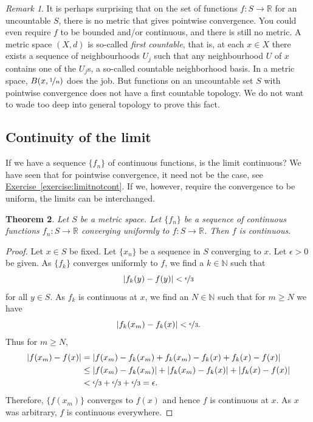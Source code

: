 \documentclass[12pt,openany]{book}
\newcommand{\abs}[1]{\left\lvert {#1} \right\rvert}
\newcommand{\R}{{\mathbb{R}}}
\newcommand{\N}{{\mathbb{N}}}
\newcommand{\myindex}[1]{#1\index{#1}}
\theoremstyle{plain}
\newtheorem{thm}{Theorem}[section]
\theoremstyle{remark}
\newtheorem{remark}[thm]{Remark}
\theoremstyle{definition}
\theoremstyle{exercise}
\theoremstyle{example}
\newcommand{\exerciseref}[1]{\hyperref[#1]{Exercise~\ref*{#1}}}
\begin{document}
\begin{remark}
It is perhaps surprising that on the set of functions $f \colon S \to
\R$ for an uncountable $S$, there is no metric that gives pointwise convergence.
You could even require $f$ to be bounded and/or continuous, and there is
still no metric.
A metric space $(X,d)$ is so-called \emph{\myindex{first countable}}, that
is, at each $x \in X$ there exists a sequence of neighbourhoods $U_j$ such
that any neighbourhood $U$ of $x$ contains one of the $U_j$s, a so-called
countable neighborhood basis.  In a metric space, $B(x,\nicefrac{1}{n})$
does the job.  But functions on an uncountable set $S$ with pointwise
convergence does not have a first countable topology.  We do not want to
wade too deep into general topology to prove this fact.
\end{remark}

\subsection{Continuity of the limit}

If we have a sequence $\{ f_n \}$ of continuous functions,
is the limit continuous?  We have seen that for pointwise
convergence, it need not be the case, see \exerciseref{exercise:limitnotcont}.
If we, however, require the convergence to be uniform, the limits can
be interchanged.

\begin{thm} \label{thm:uniformlimitcont}
Let $S$ be a metric space.
Let $\{ f_n \}$ be 
a sequence of continuous functions $f_n \colon S \to \R$ converging
uniformly to  $f \colon S \to \R$.  Then $f$ is continuous.
\end{thm}

\begin{proof}
Let $x \in S$ be fixed.  Let $\{ x_n \}$ be a sequence in $S$
converging to $x$.
Let $\epsilon > 0$ be given.
As $\{ f_k \}$ converges uniformly to $f$, we find a $k \in \N$ such that
\begin{equation*}
\abs{f_k(y)-f(y)} < \nicefrac{\epsilon}{3}
\end{equation*}
for all $y \in S$.  As $f_k$ is continuous at $x$,
we find an $N \in \N$ such that for $m \geq N$
we have 
\begin{equation*}
\abs{f_k(x_m)-f_k(x)} < \nicefrac{\epsilon}{3} .
\end{equation*}
Thus for
$m \geq N$,
\begin{equation*}
\begin{split}
\abs{f(x_m)-f(x)}
& =
\abs{f(x_m)-f_k(x_m)+f_k(x_m)-f_k(x)+f_k(x)-f(x)}
\\
& \leq
\abs{f(x_m)-f_k(x_m)}+
\abs{f_k(x_m)-f_k(x)}+
\abs{f_k(x)-f(x)}
\\
& <
\nicefrac{\epsilon}{3} +
\nicefrac{\epsilon}{3} +
\nicefrac{\epsilon}{3} = \epsilon .
\end{split}
\end{equation*}
Therefore, $\{ f(x_m) \}$ converges to $f(x)$ and hence $f$ is continuous at
$x$.  As $x$ was arbitrary, $f$ is continuous everywhere.
\end{proof}
\end{document}
